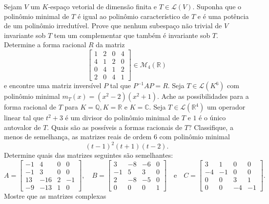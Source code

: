 \documentclass[11pt,a4paper]{article}
\begin{document}
 Sejam $V$ um $K$-espaço vetorial de dimensão finita e $T \in \mathcal{L}(V).$ Suponha que o polinômio
minimal de $T$ é igual ao polinômio característico de $T$ e é uma potência de um polinômio irredutível. Prove que nenhum subespaço não trivial de $V$ invariante sob $T$ tem um complementar que também é invariante sob $T.$  
            \solucao{}
     Determine a forma racional $R$ da matriz
    \[
    \begin{bmatrix}
    1 & 2 & 0 & 4\\
    4 & 1 & 2 & 0 \\
    0 & 4 & 1 & 2 \\
    2 & 0 & 4 & 1
    \end{bmatrix} \in \mathcal{M}_4(\mathbb{R})
    \]
e encontre uma matriz inversível $P$ tal que $P^{-1}AP = R.$    
        \solucao{}
     Seja $T \in \mathcal{L}(K^6)$ com polinômio minimal $m_T(x) = (x^2 - 2)(x^2 + 1).$ Ache as possibilidades para a forma racional de $T$ para $K = \mathbb{Q}, K = \mathbb{R}$ e $K = \mathbb{C}.$   
            \solucao{}
     Seja $T \in \mathcal{L}(\mathbb{R}^4)$ um operador linear tal que $t^2 + 3$ é um divisor do polinômio minimal de $T$
e $1$ é o único autovalor de $T.$ Quais são as possíveis a formas racionais de $T?$               \solucao{}
     Classifique, a menos de semelhança, as matrizes reais de ordem $6$ com polinômio minimal
\[(t - 1)^2(t + 1)(t - 2). \]
                 \solucao{}
     Determine quais das matrizes seguintes são semelhantes:
\[
A  =\begin{bmatrix}
-1 & 4 & 0 & 0\\
-1 & 3 & 0 & 0 \\
13 & -16 & 2 & -1 \\
-9 & -13 & 1 & 0
\end{bmatrix}, \quad B  =\begin{bmatrix}
3 & -8 & -6 & 0\\
-1 &5 & 3 & 0 \\
2 & -8 & -5& 0 \\
0 & 0 & 0 & 1
\end{bmatrix} \quad \mbox{e} \quad C  =\begin{bmatrix}
3 & 1 & 0& 0\\
-4 &-1 & 0 & 0 \\
0 & 0 & 3& 1 \\
0 & 0 & -4 & -1
\end{bmatrix}.
\]
                 \solucao{}
      Mostre que as matrizes complexas
\end{document}
